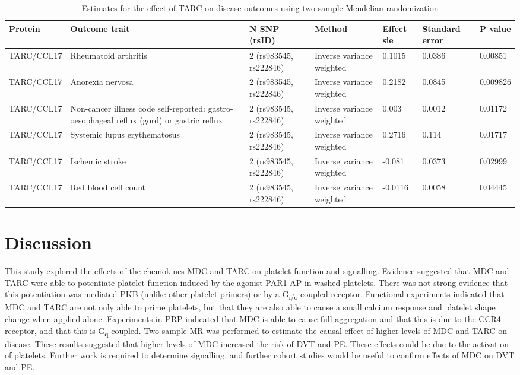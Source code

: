 \documentclass[11pt,twoside]{bristolthesis}
\begin{document}
\begin{landscape}\begin{table}

\caption{\label{tab:TARC-disease-MR}Estimates for the effect of TARC on disease outcomes using two sample Mendelian randomization}
\centering
\begin{tabu} to 
\toprule
Protein & Outcome trait & N SNP (rsID) & Method & Effect sie & Standard error & P value\\
\midrule
TARC/CCL17 & Rheumatoid arthritis & 2 (rs983545, rs222846) & Inverse variance weighted & 0.1015 & 0.0386 & 0.00851\\
TARC/CCL17 & Anorexia nervosa & 2 (rs983545, rs222846) & Inverse variance weighted & 0.2182 & 0.0845 & 0.009826\\
TARC/CCL17 & Non-cancer illness code self-reported: gastro-oesophageal reflux (gord) or gastric reflux & 2 (rs983545, rs222846) & Inverse variance weighted & 0.003 & 0.0012 & 0.01172\\
TARC/CCL17 & Systemic lupus erythematosus & 2 (rs983545, rs222846) & Inverse variance weighted & 0.2716 & 0.114 & 0.01717\\
TARC/CCL17 & Ischemic stroke & 2 (rs983545, rs222846) & Inverse variance weighted & -0.081 & 0.0373 & 0.02999\\
\addlinespace
TARC/CCL17 & Red blood cell count & 2 (rs983545, rs222846) & Inverse variance weighted & -0.0116 & 0.0058 & 0.04445\\
\bottomrule
\end{tabu}
\end{table}
\end{landscape}
\hypertarget{discussion-2}{%
\section{Discussion}\label{discussion-2}}

This study explored the effects of the chemokines MDC and TARC on platelet function and signalling. Evidence suggested that MDC and TARC were able to potentiate platelet function induced by the agonist PAR1-AP in washed platelets. There was not strong evidence that this potentiation was mediated PKB (unlike other platelet primers) or by a G\textsubscript{i/o}-coupled receptor. Functional experiments indicated that MDC and TARC are not only able to prime platelets, but that they are also able to cause a small calcium response and platelet shape change when applied alone. Experiments in PRP indicated that MDC is able to cause full aggregation and that this is due to the CCR4 receptor, and that this is G\textsubscript{q} coupled. Two sample MR was performed to estimate the causal effect of higher levels of MDC and TARC on disease. These results suggested that higher levels of MDC increased the risk of DVT and PE. These effects could be due to the activation of platelets. Further work is required to determine signalling, and further cohort studies would be useful to confirm effects of MDC on DVT and PE.
\end{document}
